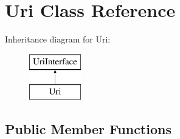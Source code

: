 \hypertarget{class_pes_1_1_http_1_1_uri}{}\section{Uri Class Reference}
\label{class_pes_1_1_http_1_1_uri}
Inheritance diagram for Uri\+:\begin{figure}[H]
\begin{center}
\leavevmode
\includegraphics[height=2.000000cm]{class_pes_1_1_http_1_1_uri}
\end{center}
\end{figure}
\subsection*{Public Member Functions}

